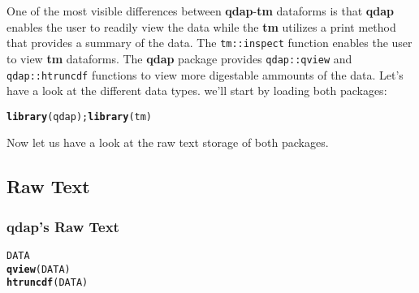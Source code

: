 \documentclass{article}\usepackage[]{graphicx}\usepackage[]{color}
\makeatletter
\newcommand{\hlstd}[1]{\textcolor[rgb]{0.345,0.345,0.345}{#1}}%
\newcommand{\hlkwd}[1]{\textcolor[rgb]{0.737,0.353,0.396}{\textbf{#1}}}%
\newenvironment{kframe}{%
 \def\at@end@of@kframe{}%
 \ifinner\ifhmode%
  \def\at@end@of@kframe{\end{minipage}}%
  \begin{minipage}{\columnwidth}%
 \fi\fi%
 \def\FrameCommand##1{\hskip\@totalleftmargin \hskip-\fboxsep
 \colorbox{shadecolor}{##1}\hskip-\fboxsep
     \hskip-\linewidth \hskip-\@totalleftmargin \hskip\columnwidth}%
 \MakeFramed {\advance\hsize-\width
   \@totalleftmargin\z@ \linewidth\hsize
   \@setminipage}}%
 {\par\unskip\endMakeFramed%
 \at@end@of@kframe}
\newenvironment{knitrout}{}{} %
\makeatother
\begin{document}
\begin{singlespace}
\begin{table}[!ht]
\begin{center}
\end{center}
\end{table}
\end{singlespace}

One of the most visible differences between \textbf{qdap}-\textbf{tm} dataforms is that \textbf{qdap} enables the user to readily view the data while the \textbf{tm} utilizes a print method that provides a summary of the data.  The \texttt{tm::inspect} function enables the user to view \textbf{tm} dataforms. The \textbf{qdap} package provides \texttt{qdap::qview} and \texttt{qdap::htruncdf} functions to view more digestable ammounts of the data. Let's have a look at the different data types.  we'll start by loading both packages:


\begin{knitrout}
\color{fgcolor}\begin{kframe}
\begin{alltt}
\hlkwd{library}\hlstd{(qdap);} \hlkwd{library}\hlstd{(tm)}
\end{alltt}
\end{kframe}
\end{knitrout}


\noindent Now let us have a look at the raw text storage of both packages. \\ 

\subsection{Raw Text}
\subsubsection{qdap's Raw Text}
\begin{knitrout}
\color{fgcolor}\begin{kframe}
\begin{alltt}
\hlstd{DATA}
\hlkwd{qview}\hlstd{(DATA)}
\hlkwd{htruncdf}\hlstd{(DATA)}
\end{alltt}
\end{kframe}
\end{knitrout}
\end{document}
